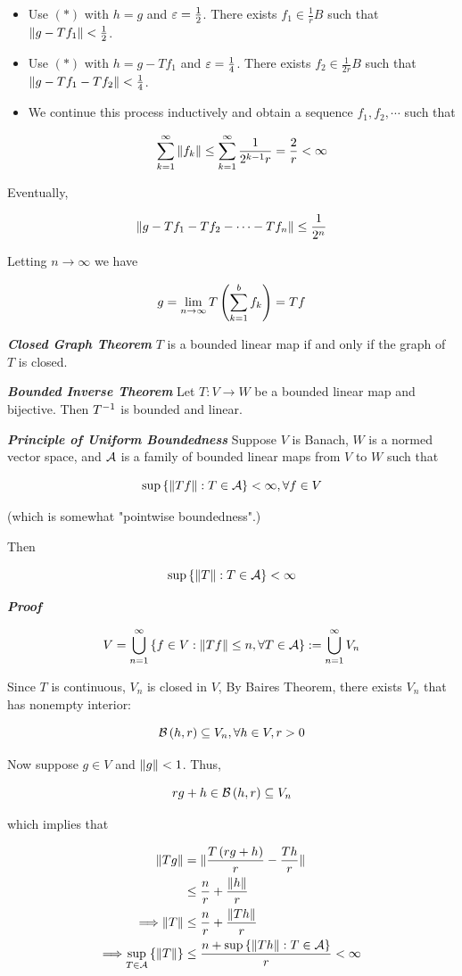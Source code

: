 \documentclass[
]{article}
\begin{document}
\begin{itemize}
\item
  Use \((*)\) with \(h = g\) and \(\ve = \frac12\). There exists
  \(f_1\in \frac1rB\) such that \(\norm{g-Tf_1}<\frac12\).
\item
  Use \((*)\) with \(h = g-Tf_1\) and \(\ve = \frac14\). There exists
  \(f_2\in \frac1{2r}B\) such that \(\norm{g-Tf_1-Tf_2}<\frac14\).
\item
  We continue this process inductively and obtain a sequence
  \(f_1,f_2,\cdots\) such that

  \[\sinf \norm{f_k}\le \sinf \frac{1}{2^{k-1}r} = \frac2r<\infty\]
\end{itemize}

Eventually,

\[\norm{g-Tf_1-Tf_2-\cdots-Tf_n}\le \frac1{2^n}\]

Letting \(n\to \infty\) we have

\[g = \lim_{n\to\infty}T\pr{\sum_{k = 1}^b f_k} = Tf\]

\emph{\textbf{Closed Graph Theorem}} \(T\) is a bounded linear map if
and only if the graph of \(T\) is closed.

\emph{\textbf{Bounded Inverse Theorem}} Let \(T:V\to W\) be a bounded
linear map and bijective. Then \(\inv T\) is bounded and linear.

\emph{\textbf{Principle of Uniform Boundedness}} Suppose \(V\) is
Banach, \(W\) is a normed vector space, and \(\A\) is a family of
bounded linear maps from \(V\) to \(W\) such that

\[\sup\brace{\norm{Tf}:T\in \A}<\infty,\forall f\in V\]

(which is somewhat "pointwise boundedness".)

Then

\[\sup\brace{\norm{T}:T\in \A}<\infty\]

\emph{\textbf{Proof}}

\[V = \uinf[n] \brace{f\in V:\norm{Tf}\le n,\forall T\in \A}:= \uinf[n]V_n\]

Since \(T\) is continuous, \(V_n\) is closed in \(V\), By
Baire\textquotesingle s Theorem, there exists \(V_n\) that has nonempty
interior:

\[\B\pr{h,r}\se V_n,\forall h\in V,r>0\]

Now suppose \(g\in V\) and \(\norm{g}<1\). Thus,

\[rg+h\in \B\pr{h,r}\se V_n\]

which implies that

\[\ba
\norm{Tg} & = \norm{\frac{T\pr{rg+h}}{r}-\frac{Th}{r}}\\
& \le \frac nr+\frac{\norm{h}}{r}\\
\too \norm{T} & \le \frac nr+\frac{\norm{Th}}{r}\\
\too \sup_{T\in \A}\brace{\norm{T}} & \le \frac{n+\sup\brace{\norm{Th}:T\in \A}}{r}<\infty
\ea\]
\end{document}
